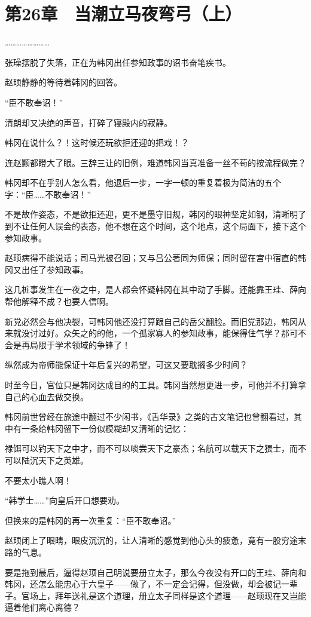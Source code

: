 \section{第26章　当潮立马夜弯弓（上）}

……………………

张璪摆脱了失落，正在为韩冈出任参知政事的诏书奋笔疾书。

赵顼静静的等待着韩冈的回答。

“臣不敢奉诏！”

清朗却又决绝的声音，打碎了寝殿内的寂静。

韩冈在说什么？！这时候还玩欲拒还迎的把戏！？

连赵颢都瞪大了眼。三辞三让的旧例，难道韩冈当真准备一丝不苟的按流程做完？

韩冈却不在乎别人怎么看，他退后一步，一字一顿的重复着极为简洁的五个字：“臣……不敢奉诏！”

不是故作姿态，不是欲拒还迎，更不是墨守旧规，韩冈的眼神坚定如钢，清晰明了到不让任何人误会的表态，他不想在这个时间，这个地点，这个局面下，接下这个参知政事。

赵顼病得不能说话；司马光被召回；又与吕公著同为师保；同时留在宫中宿直的韩冈又出任了参知政事。

这几桩事发生在一夜之中，是人都会怀疑韩冈在其中动了手脚。还能靠王珪、薛向帮他解释不成？也要人信啊。

新党必然会与他决裂，可韩冈他还没打算跟自己的岳父翻脸。而旧党那边，韩冈从来就没讨过好。众矢之的的他，一个孤家寡人的参知政事，能保得住气学？那可不会是再局限于学术领域的争锋了！

纵然成为帝师能保证十年后复兴的希望，可这又要耽搁多少时间？

时至今日，官位只是韩冈达成目的的工具。韩冈当然想更进一步，可他并不打算拿自己的心血去做交换。

韩冈前世曾经在旅途中翻过不少闲书，《舌华录》之类的古文笔记也曾翻看过，其中有一条给韩冈留下一份似模糊却又清晰的记忆：

禄饵可以钓天下之中才，而不可以啖尝天下之豪杰；名航可以载天下之猥士，而不可以陆沉天下之英雄。

不要太小瞧人啊！

“韩学士……”向皇后开口想要劝。

但换来的是韩冈的再一次重复：“臣不敢奉诏。”

赵顼闭上了眼睛，眼皮沉沉的，让人清晰的感觉到他心头的疲惫，竟有一股穷途末路的气息。

要是拖到最后，逼得赵顼自己明说要册立太子，那么今夜没有开口的王珪、薛向和韩冈，还怎么能忠心于六皇子——做了，不一定会记得，但没做，却会被记一辈子。官场上，拜年送礼是这个道理，册立太子同样是这个道理——赵顼现在又岂能逼着他们离心离德？

